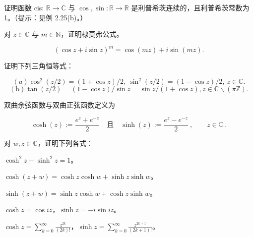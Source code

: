 \exerciseshead

\begin{exercises}
\item

证明函数 cis: $ \mathbb{R} \to \mathbb{C} $ 与 $ \cos, \sin : \mathbb{R} \to \mathbb{R} $ 是利普希茨连续的，且利普希茨常数为 1。（提示：见例 2.25(b)。）

\item

对 $ z \in \mathbb{C} $ 与 $ m \in \mathbb{N} $，证明棣莫弗公式。

\[
\left(\cos z+i\sin z\right)^{m}=\cos(m z)+i\sin(m z).
\]
\item

证明下列三角恒等式：

\[
(a)\cos^{2}(z/2)=(1+\cos z)/2,\ \sin^{2}(z/2)=(1-\cos z)/2,\ z\in\mathbb{C}.
\]
\[
\mathrm{(b)}\operatorname{t a n}(z/2)=(1-\operatorname{c o s}z)/\operatorname{s i n}z=\operatorname{s i n}z/(1+\operatorname{c o s}z),z\in\mathbb{C}\backslash(\pi\mathbb{Z}).
\]
\item

双曲余弦函数与双曲正弦函数定义为

\[
\operatorname{c o s h}(z):=\frac{e^{z}+e^{-z}}{2}\quad\text{且}\quad\operatorname{s i n h}(z):=\frac{e^{z}-e^{-z}}{2}~,\qquad z\in\mathbb{C}~.
\]

对 $ w, z \in \mathbb{C} $，证明下列各式：

\begin{items}
\item

$ \cosh^{2}z - \sinh^{2}z = 1 $。

\item

$ \cosh(z+w) = \cosh z \cosh w + \sinh z \sinh w $。

\item

$ \sinh(z+w) = \sinh z \cosh w + \cosh z \sinh w $。

\item

$ \cosh z = \cos iz $，$ \sinh z = -i \sin iz $。

\item

$ \cosh z = \sum_{k=0}^{\infty} \frac{z^{2k}}{(2k)!} $，$ \sinh z = \sum_{k=0}^{\infty} \frac{z^{2k+1}}{(2k+1)!} $。

\end{items}

\item


\end{exercises}
